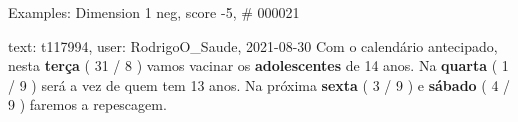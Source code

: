 \begin{frame}{Examples: Dimension 1 neg, score -5, \# 000021}
\footnotesize
\begin{alertblock}{text: t117994, user: RodrigoO\_Saude, 2021-08-30}
Com o calendário antecipado, nesta \textbf{terça} ( 31 / 8 ) vamos vacinar os 
\textbf{adolescentes} de 14 anos. Na \textbf{quarta} ( 1 / 9 ) será a vez de 
quem tem 13 anos. Na próxima \textbf{sexta} ( 3 / 9 ) e \textbf{sábado} ( 4 / 9 
) faremos a repescagem. 
\end{alertblock}
\end{frame}
